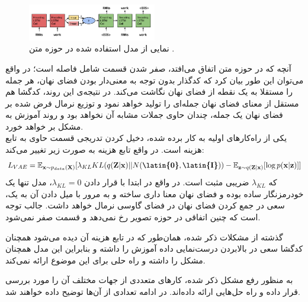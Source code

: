 \begin{figure}[H]
	\centering
	\includegraphics[width=0.5\textwidth]{images/vae-text.png}
	\caption{
		نمایی از مدل \vae{} استفاده شده در حوزه متن
		\cite{vae_text}.}
	\label{fig:vae-text}
\end{figure}
\label{chap2:latent_ignore}
آنچه که در حوزه متن اتفاق می‌افتد، صفر شدن قسمت شامل فاصله   است؛ در واقع می‌توان این طور بیان کرد که کدگذار بدون توجه به معنی‌دار بودن فضای نهان، هر جمله را مستقلا به یک نقطه از فضای نهان نگاشت می‌کند. در نتیجه‌ی این روند، کدگشا هم مستقل از معنای فضای نهان جمله‌ای را تولید خواهد نمود و توزیع نرمال فرض شده بر فضای نهان یک جمله، چندان حاوی جملات مشابه آن نخواهد بود و روند آموزش به مشکل بر خواهد خورد. \\
یکی از راه‌کارهای اولیه به کار برده شده، دخیل کردن تدریجی قسمت حاوی  به تابع هزینه است. در واقع تابع هزینه به صورت زیر تغییر می‌کند:
\begin{equation}
	\begin{split}
		L_{VAE} = \expected_{\bff{x} \sim p_{data}(\bff{X})} [\lambda_{KL} KL(q(\bff{Z}|\bff{x}) || N(\textbf{\latin{0}},\textbf{\latin{I}}))- \expected_{\bff{z} \sim q(\bff{Z}|\bff{x})}[\log p(\bff{x}|\bff{z})]]
	\end{split}
\end{equation}
که $\lambda_{KL}$ ضریبی مثبت است. در واقع در ابتدا با قرار دادن $\lambda_{KL}=0$، مدل تنها یک خودرمزنگار ساده بوده و فضای نهان معنا داری ساخته و به مرور با میل دادن آن به یک، سعی در جمع کردن فضای نهان در فضای گاوسی نرمال خواهد داشت. جالب توجه است که چنین اتفاقی در حوزه تصویر رخ نمی‌دهد و قسمت  صفر نمی‌شود.

گذشته از مشکلات ذکر شده، همان‌طور که در تابع هزینه آن دیده می‌شود همچنان کدگشا سعی در بالابردن درست‌نمایی داده آموزش را داشته و بنابراین این مدل همچنان مشکل \expbias{} را داشته و راه حلی برای این موضوع ارائه نمی‌کند.

به منظور رفع مشکل ذکر شده، کارهای متعددی از جهات مختلف آن را مورد بررسی قرار داده و راه حل‌هایی ارائه داده‌اند. در ادامه تعدادی از آن‌ها توضیح داده خواهند شد.
